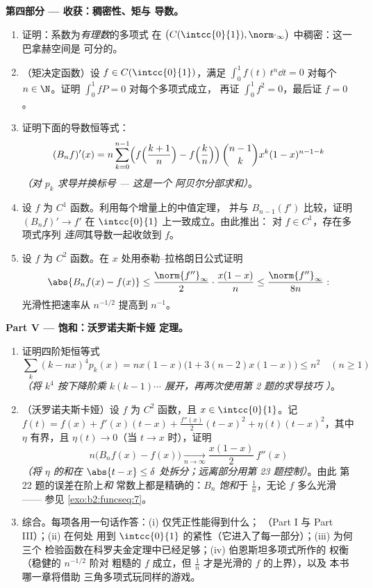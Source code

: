 \begin{problem}
\medskip
\noindent\textbf{第四部分 --- 收获：稠密性、矩与
导数。}
\begin{enumerate}[resume]
  \item 证明：系数为\emph{有理数}的多项式
        在 $\bigl(C(\intcc{0}{1}),
        \norm\cdot_\infty\bigr)$ 中稠密：这一巴拿赫空间是
        可分的。
  \item （矩决定函数）设 $f \in
        C(\intcc{0}{1})$，满足 $\int_0^1 f(t)\,t^n \dd t = 0$
        对每个 $n \in \N$。证明 $\int_0^1 f P = 0$ 对每个多项式成立，
        再证 $\int_0^1 f^2 = 0$，最后证 $f = 0$。
  \item 证明下面的导数恒等式：
        \[
        (B_nf)'(x) = n\sum_{k=0}^{n-1}\Bigl(
        f\Bigl(\frac{k+1}{n}\Bigr) -
        f\Bigl(\frac kn\Bigr)\Bigr)\,
        \binom{n-1}{k}x^k(1-x)^{n-1-k}
        \]
        \emph{（对 $p_k$ 求导并换标号 --- 这是一个
        阿贝尔分部求和）}。
  \item 设 $f$ 为 $C^1$ 函数。利用每个增量上的中值定理，
        并与 $B_{n-1}(f')$ 比较，证明
        $(B_nf)' \to f'$ 在 $\intcc{0}{1}$ 上一致成立。由此推出：
        对 $f \in C^1$，存在多项式序列
        \emph{连同}其导数一起收敛到 $f$。
  \item 设 $f$ 为 $C^2$ 函数。在 $x$ 处用泰勒–拉格朗日公式证明
        \[
        \abs{B_nf(x) - f(x)} \leq
        \frac{\norm{f''}_\infty}{2}\cdot\frac{x(1-x)}{n}
        \leq \frac{\norm{f''}_\infty}{8n} :
        \]
        光滑性把速率从 $n^{-1/2}$ 提高到
        $n^{-1}$。
\end{enumerate}

\medskip
\noindent\textbf{Part V --- 饱和：沃罗诺夫斯卡娅
定理。}
\begin{enumerate}[resume]
  \item 证明四阶矩恒等式
        \[
        \sum_k (k - nx)^4 p_k(x)
        = nx(1-x)\bigl(1 + 3(n-2)x(1-x)\bigr) \leq n^2
        \quad (n \geq 1)
        \]
        \emph{（将 $k^4$ 按下降阶乘 $k(k-1)\cdots$
        展开，再两次使用第 2 题的求导技巧
        ）}。
  \item （沃罗诺夫斯卡娅）设 $f$ 为 $C^2$ 函数，且 $x \in
        \intcc{0}{1}$。记 $f(t) = f(x) + f'(x)(t-x) +
        \frac{f''(x)}2(t-x)^2 + \eta(t)(t-x)^2$，其中 $\eta$
        有界，且 $\eta(t) \to 0$（当 $t \to x$ 时），证明
        \[
        n\bigl(B_nf(x) - f(x)\bigr)
        \xrightarrow[n\to\infty]{}
        \frac{x(1-x)}{2}\,f''(x)
        \]
        \emph{（将 $\eta$ 的和在 $\abs{t - x} \leq
        \delta$ 处拆分；远离部分用第 23 题控制）}。由此
        第 22 题的误差在阶上\emph{和}
        常数上都是精确的：$B_n$ \emph{饱和}于 $\frac1n$，无论
        $f$ 多么光滑 —— 参见
        \cref{exo:b2:funcseq:7}。
  \item 综合。每项各用一句话作答：(i) 仅凭正性能得到什么；
        （Part I 与 Part III）；(ii) 在何处
        用到 $\intcc{0}{1}$ 的紧性（它进入了每一部分）；(iii) 为何三个
        检验函数在科罗夫金定理中已经足够；(iv) 伯恩斯坦多项式所作的
        权衡（稳健的 $n^{-1/2}$ 阶对
        粗糙的 $f$ 成立，但 $\frac1n$ 才是光滑的 $f$ 的上界），以及
        本书哪一章将借助
        三角多项式玩同样的游戏。
\end{enumerate}
\end{problem}
